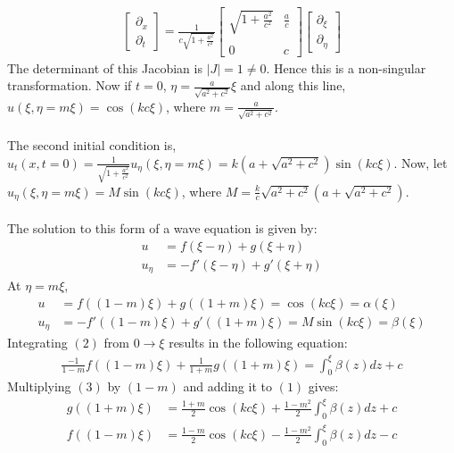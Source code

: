 \documentclass[11pt]{article}
\begin{document}
\begin{enumerate}
\begin{enumerate}[label = (\alph*)]
\begin{align*}
\begin{bmatrix}
\partial_x \\
\partial_t
\end{bmatrix}  = \frac{1}{c\sqrt{1 + \frac{a^2}{c^2}}} 
\begin{bmatrix}
\sqrt{1 + \frac{a^2}{c^2}} & \frac{a}{c} \\ \\
0 & c
\end{bmatrix} \begin{bmatrix}
\partial_\xi \\
\partial_\eta
\end{bmatrix}
\end{align*}
The determinant of this Jacobian is $|J| = 1 \neq 0$. Hence this is a non-singular transformation. Now if $t=0$, $\eta = \frac{a}{\sqrt{a^2 + c^2}}\xi$ and along this line, $u(\xi, \eta = m\xi) = \cos(kc\xi)$, where $m = \frac{a}{\sqrt{a^2 + c^2}}$. \\ \\
The second initial condition is, $u_t(x, t=0) = \frac{1}{\sqrt{1 + \frac{a^2}{c^2}}}u_\eta(\xi, \eta = m\xi) = k(a+\sqrt{a^2 + c^2}) \sin(kc\xi)$. Now, let $u_\eta(\xi, \eta = m\xi) = M\sin(kc\xi)$, where $M = \frac{k}{c}\sqrt{a^2 + c^2}(a + \sqrt{a^2 + c^2})$. \\ \\
The solution to this form of a wave equation is given by: 
\begin{align*}
u & = f(\xi - \eta) + g(\xi + \eta) \\
u_\eta & = -f'(\xi - \eta) + g'(\xi + \eta) 
\end{align*}
At $\eta = m\xi$, 
\begin{align}
u & = f((1-m)\xi) + g((1+m)\xi) = \cos(kc\xi) = \alpha(\xi)\\
u_\eta & = -f'((1-m)\xi) + g'((1+m)\xi) = M\sin(kc\xi) = \beta(\xi)
\end{align}
Integrating $(2)$ from $0 \rightarrow \xi$ results in the following equation: 
\begin{align}
\frac{-1}{1-m} f((1-m)\xi) + \frac{1}{1+m}g((1+m)\xi) = \int_0^\xi \beta(z) dz + c
\end{align}
Multiplying $(3)$ by $(1-m)$ and adding it to $(1)$ gives: 
\begin{align}
g((1+m)\xi) & = \frac{1+m}{2} \cos(kc\xi) + \frac{1-m^2}{2}\int_0^\xi \beta(z) dz + c \\
f((1-m)\xi) & = \frac{1-m}{2}\cos(kc\xi) - \frac{1-m^2}{2}\int_0^\xi \beta(z) dz - c

\end{align}
\end{enumerate}
\end{enumerate}
\end{document}
